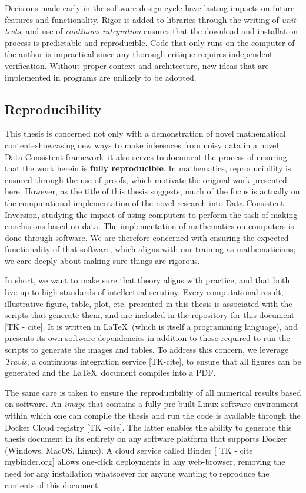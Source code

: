Decisions made early in the software design cycle have lasting impacts on future features and functionality.
Rigor is added to libraries through the writing of \emph{unit tests}, and use of \emph{continous integration} ensures that the download and installation process is predictable and reproducible.
Code that only runs on the computer of the author is impractical since any thorough critique requires independent verification.
Without proper context and architecture, new ideas that are implemented in programs are unlikely to be adopted.

\subsection{Reproducibility}
This thesis is concerned not only with a demonstration of novel mathematical content\---showcasing new ways to make inferences from noisy data in a novel Data-Consistent framework\---it also serves to document the process of ensuring that the work herein is \textbf{fully reproducible}.
In mathematics, reproducibility is ensured through the use of proofs, which motivate the original work presented here.
However, as the title of this thesis suggests, much of the focus is actually on the computational implementation of the novel research into Data Consistent Inversion, studying the impact of using computers to perform the task of making conclusions based on data.
The implementation of mathematics on computers is done through software.
We are therefore concerned with ensuring the expected functionality of that software, which aligns with our training as mathematicians; we care deeply about making sure things are rigorous.

In short, we want to make sure that theory aligns with practice, and that both live up to high standards of intellectual scrutiny.
Every computational result, illustrative figure, table, plot, etc. presented in this thesis is associated with the scripts that generate them, and are included in the  repository for this document [TK - cite].
It is written in \LaTeX~(which is itself a programming language), and presents its own software dependencies in addition to those required to run the scripts to generate the images and tables.
To address this concern, we leverage \emph{Travis}, a continuous integration service [TK-cite], to ensure that all figures can be generated and the \LaTeX\, document compiles into a PDF.

The same care is taken to ensure the reproducibility of all numerical results based on software.
An \emph{image} that contains a fully pre-built Linux software environment within which one can compile the thesis and run the code is available through the Docker Cloud registry [TK -cite].
The latter enables the ability to generate this thesis document in its entirety on any software platform that supports Docker (Windows, MacOS, Linux).
A cloud service called Binder [ TK - cite mybinder.org] allows one-click deployments in any web-browser, removing the need for any installation whatsoever for anyone wanting to reproduce the contents of this document.

